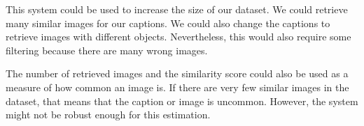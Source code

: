 This system could be used to increase the size of our dataset. We could retrieve many similar images for our captions. We could also change the captions to retrieve images with different objects. Nevertheless, this would also require some filtering because there are many wrong images.

The number of retrieved images and the similarity score could also be used as a measure of how common an image is. If there are very few similar images in the dataset, that means that the caption or image is uncommon. However, the system might not be robust enough for this estimation.